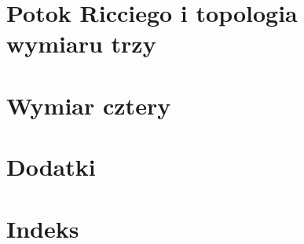 \documentclass[11pt,a4paper]{report}
\begin{document}

\setcounter{chapter}{30}
\setcounter{part}{3}

\part{Potok Ricciego i topologia wymiaru trzy}




\part{Wymiar cztery}







\part{Dodatki}
\appendix




\part{Indeks}

\end{document}
